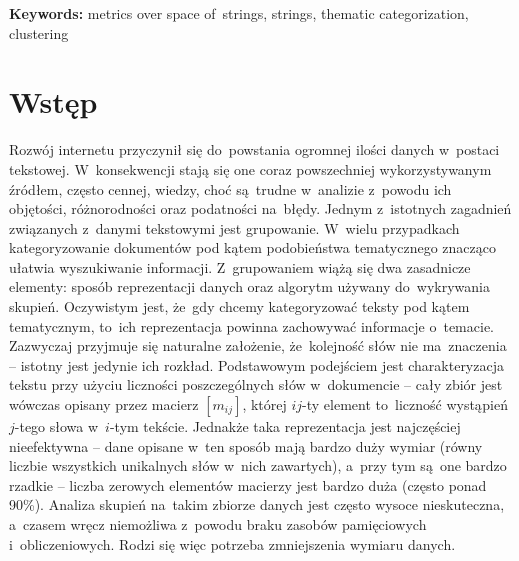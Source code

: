 \documentclass{praca1}
\begin{document}
\textbf{Keywords:} metrics over space of~strings, strings, thematic categorization, clustering


  \tableofcontents

\chapter{Wstęp}



Rozwój internetu przyczynił się do~powstania ogromnej ilości danych w~postaci tekstowej. W~konsekwencji stają się one coraz powszechniej wykorzystywanym źródłem, często cennej, wiedzy, choć są~trudne w~analizie z~powodu ich objętości, różnorodności oraz podatności na~błędy. %
Jednym z~istotnych zagadnień związanych z~danymi tekstowymi jest grupowanie. W~wielu przypadkach kategoryzowanie dokumentów pod kątem podobieństwa tematycznego znacząco ułatwia wyszukiwanie informacji. Z~grupowaniem wiążą się dwa zasadnicze elementy: sposób reprezentacji danych oraz algorytm używany do~wykrywania skupień. Oczywistym jest, że~gdy chcemy kategoryzować teksty pod kątem tematycznym, to~ich reprezentacja powinna zachowywać informacje o~temacie. Zazwyczaj przyjmuje się naturalne założenie, że~kolejność słów nie ma~znaczenia -- istotny jest jedynie ich rozkład. Podstawowym podejściem jest charakteryzacja tekstu przy użyciu liczności poszczególnych słów w~dokumencie -- cały zbiór jest wówczas opisany przez macierz $[m_{ij}]$, której $ij$-ty element to~liczność wystąpień \hbox{$j$-tego} słowa w~$i$-tym tekście. Jednakże taka reprezentacja jest najczęściej nieefektywna -- dane opisane w~ten sposób mają bardzo duży wymiar (równy liczbie wszystkich unikalnych słów w~nich zawartych), a~przy tym są~one bardzo rzadkie -- liczba zerowych elementów macierzy jest bardzo duża (często ponad 90\%). Analiza skupień na~takim zbiorze danych jest często wysoce nieskuteczna, a~czasem wręcz niemożliwa z~powodu braku zasobów pamięciowych i~obliczeniowych. Rodzi się więc potrzeba zmniejszenia wymiaru danych.
\end{document}
